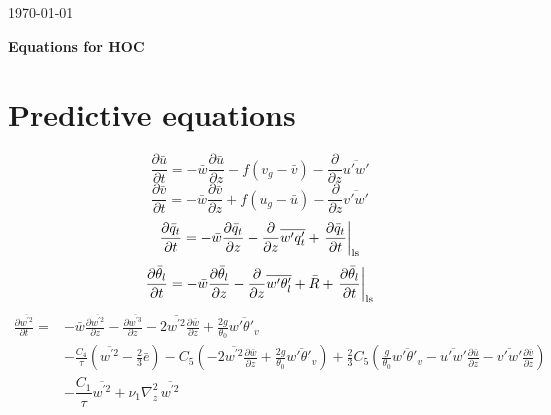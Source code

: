 \documentclass[11pt,fleqn]{article}
\newcommand{\ptlder}[2]{\frac{\partial #1}{\partial #2}}
\begin{document}
\begin{flushright} \today \end{flushright}

\vspace*{.1in}
\begin{center}  {\Large\bf Equations for HOC}  \end{center}
\vspace*{.1in}

\section{Predictive equations}

\begin{equation}
\label{eq_um}
\ptlder{\bar{u}}{t} 
= - \bar{w}\ptlder{\bar{u}}{z} 
  - f (v_g - \bar{v})
  - \ptlder{}{z}\overline{u'w'} 
\end{equation}
%
\begin{equation}
\label{eq_vm}
\ptlder{\bar{v}}{t} 
= - \bar{w}\ptlder{\bar{v}}{z} 
  + f (u_g - \bar{u})
  - \ptlder{}{z}\overline{v'w'} 
\end{equation}
%
\begin{equation}
\label{eq_qtm}
\ptlder{\bar{q}_t}{t}
= - \bar{w}\ptlder{\bar{q}_t}{z} 
  - \ptlder{}{z}\overline{w'q'_t} 
  + \left. \ptlder{\bar{q}_t}{t} \right|_{\rm ls}
\end{equation}
%
\begin{equation}
\label{eq_thlm}
\ptlder{\bar{\theta}_l}{t} 
= - \bar{w}\ptlder{\bar{\theta}_l}{z} 
  - \ptlder{}{z}\overline{w'\theta'_l} 
  + \bar{R}   
  + \left. \ptlder{\bar{\theta}_l}{t} \right|_{\rm ls}
\end{equation}
%
\begin{equation}
\label{eq_wp2}
\begin{split}
\ptlder{\overline{w^{'2}}}{t} 
=& - \bar{w}\ptlder{\overline{w^{'2}}}{z}	 
   - \ptlder{\overline{w^{'3}}}{z} 
   - 2\overline{w^{'2}}\ptlder{\bar{w}}{z}
   + \frac{2g}{\theta_0} \overline{w'\theta'_v} \\
 & - \frac{C_4}{\tau} \left( \overline{w^{'2}} -\frac{2}{3}\bar{e} \right)
   - C_5 
     \left(
       - 2\overline{w^{'2}}\ptlder{\bar{w}}{z}
       + \frac{2g}{\theta_0} \overline{w'\theta'_v}
     \right)
   + \frac{2}{3} C_5
     \left(
       \frac{g}{\theta_0} \overline{w'\theta'_v} 
       - \overline{u'w'}\ptlder{\bar{u}}{z} 
       - \overline{v'w'}\ptlder{\bar{v}}{z} 
     \right) \\
 & - \dfrac{C_1}{\tau} \overline{w^{'2}} 
   + \nu_1 \nabla_z^2 \, \overline{w^{'2}}
\end{split}
\end{equation}
\end{document}
